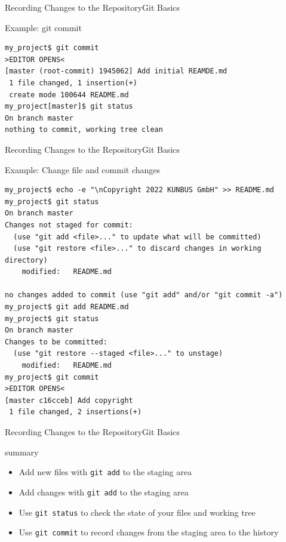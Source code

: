 \documentclass[aspectratio=169]{beamer}
\renewcommand{\footnotesize}{\tiny}
\begin{document}
\begin{frame}[fragile]{Recording Changes to the Repository}{Git Basics}
\begin{block}{Example: \ttfamily git commit}
\begin{verbatim}
my_project$ git commit
>EDITOR OPENS<
[master (root-commit) 1945062] Add initial REAMDE.md
 1 file changed, 1 insertion(+)
 create mode 100644 README.md
my_project[master]$ git status 
On branch master
nothing to commit, working tree clean
\end{verbatim}
\end{block}
\end{frame}

\begin{frame}[fragile]{Recording Changes to the Repository}{Git Basics}
\begin{block}{Example: Change file and commit changes}
\begin{verbatim}
my_project$ echo -e "\nCopyright 2022 KUNBUS GmbH" >> README.md
my_project$ git status
On branch master
Changes not staged for commit:
  (use "git add <file>..." to update what will be committed)
  (use "git restore <file>..." to discard changes in working directory)
	modified:   README.md

no changes added to commit (use "git add" and/or "git commit -a")
my_project$ git add README.md
my_project$ git status 
On branch master
Changes to be committed:
  (use "git restore --staged <file>..." to unstage)
	modified:   README.md
my_project$ git commit
>EDITOR OPENS<
[master c16cceb] Add copyright
 1 file changed, 2 insertions(+)
\end{verbatim}
\end{block}
\end{frame}

\begin{frame}[fragile]{Recording Changes to the Repository}{Git Basics}
\begin{block}{summary}
\begin{itemize}
	\item Add new files with \verb|git add| to the staging area
	\item Add changes with \verb|git add| to the staging area
	\item Use \verb|git status| to check the state of your files and working tree
	\item Use \verb|git commit| to record changes from the staging area to the history
\end{itemize}
\end{block}
\end{frame}
\end{document}
